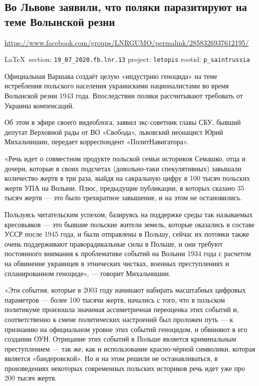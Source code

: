  
 
  
\subsection{Во Львове заявили, что поляки паразитируют на теме Волынской резни}
\url{https://www.facebook.com/groups/LNRGUMO/permalink/2858326937612195/}

\vspace{0.5cm}
{\small\LaTeX~section: \verb|19_07_2020.fb.lnr.13| project: \verb|letopis| rootid: \verb|p_saintrussia|}
\vspace{0.5cm}

Официальная Варшава создаёт целую «индустрию геноцида» на теме истребления
польского населения украинскими националистами во время Волынской резни 1943
года. Впоследствии поляки рассчитывают требовать от Украины компенсаций.

Об этом в эфире своего видеоблога, заявил экс-советник главы СБУ, бывший
депутат Верховной рады от ВО «Свобода», львовский неонацист Юрий Михальчишин,
передает корреспондент «ПолитНавигатора».

«Речь идет о совместном продукте польской семьи историков Семашко, отца и
дочери, которые в своих подсчетах (довольно-таки спекулятивных) завышали
количество жертв в три раза, выйдя на сакральную цифру в 100 тысяч польских
жертв УПА на Волыни. Плюс, предыдущие публикации, в которых сказано 35 тысяч
жертв --- это было трехкратное завышение, и на этом не остановились.

Пользуясь читательским успехом, базируясь на поддержке среды так называемых
кресовьяков --- это бывшие польские жители земель, которые оказались в составе
УССР после 1945 года, и были отправлены в Польшу, сейчас их потомки также очень
поддерживают праворадикальные силы в Польше, и они требуют постоянного внимания
к проблематике событий на Волыни 1934 года с расчетом на обвинение украинцев в
этнических чистках, военных преступлениях и спланированном геноциде», --- говорит
Михальчишин.

«Эти события, которые в 2003 году начинают набирать масштабных цифровых
параметров --- более 100 тысячи жертв, начались с того, что в польском политикуме
произошла значимая ассиметричная переоценка этих событий и, соответственно к
смене политических настроений был проложен путь --- к признанию на официальном
уровне этих событий геноцидом, и обвиняют в его создании ОУН. Отрицание этих
событий в Польше является криминальным преступлением --- так же, как и
использование красно-чёрной символики, которая является «бандеровской». Но и на
этом решили не останавливаться, в произведениях некоторых современных польских
историков речь идет уже про 200 тысяч жертв.

